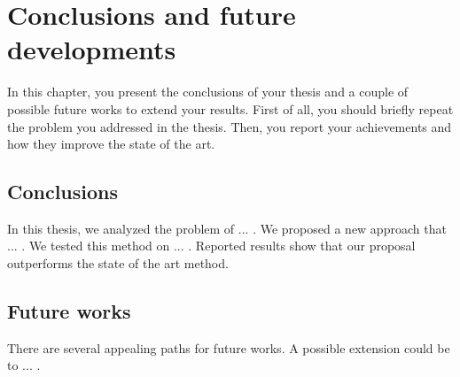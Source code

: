 \chapter{Conclusions and future developments}
\label{ch:conclusions}

In this chapter, you present the conclusions of your thesis and a couple of possible future works to extend your results. First of all, you should briefly repeat the problem you addressed in the thesis. Then, you report your achievements and how they improve the state of the art.

\section{Conclusions}
In this thesis, we analyzed the problem of ... . We proposed a new approach that ... . We tested this method on ... . Reported results show that our proposal outperforms the state of the art method.

\section{Future works}
There are several appealing paths for future works. A possible extension could be to ... .
